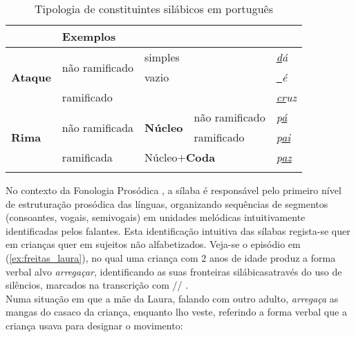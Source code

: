 \documentclass[output=paper]{LSP/langsci}
\begin{document}
\begin{table}
\begin{tabular}{lllll}
\lsptoprule
\multicolumn{4}{l}{Constituintes Silábicos}                                                          & Exemplos \\
\midrule
\multirow{3}{*}{\textbf{Ataque}} & \multirow{2}{*}{não ramificado} & \multicolumn{2}{l}{simples}              & \textit{\underline{d}á}       \\
                        &                                 & \multicolumn{2}{l}{vazio}                & \textit{\underline{~}é}       \\
                        & \multicolumn{3}{l}{ramificado}                                             & \textit{\underline{cr}uz}     \\
\multirow{3}{*}{\textbf{Rima}}   & \multirow{2}{*}{não ramificada} & \multirow{2}{*}{\textbf{Núcleo}} & não ramificado & \textit{p\underline{á}}       \\
                        &                                 &                         & ramificado     & \textit{p\underline{ai}}      \\
                        & ramificada                      & \multicolumn{2}{l}{Núcleo$+$\textbf{Coda}}          & \textit{p\underline{az}}     \\
\lspbottomrule
  \end{tabular}
  \caption{Tipologia de constituintes silábicos em português}
  \label{tab:freitas_tipologia}
\end{table}

No contexto da Fonologia Prosódica \citep{nesporvogel1986}, a sílaba é responsável pelo primeiro nível de estruturação prosódica das línguas, organizando sequências de segmentos (consoantes, vogais, semivogais) em unidades melódicas intuitivamente identificadas pelos falantes. Esta identificação intuitiva das sílabas regista-se quer em crianças quer em sujeitos não alfabetizados. Veja-se o episódio em (\ref{ex:freitas_laura}), no qual uma criança com 2 anos de idade produz a forma verbal alvo \textit{arregaçar}, identificando as suas fronteiras silábicas\largerpage através do uso de silêncios, marcados na transcrição com // \citep{freitas1997,freitas_etal2007}.\\

Numa situação em que a mãe da Laura, falando com outro adulto, \textit{arregaça} as mangas do casaco da criança, enquanto lho veste, referindo a forma verbal que a criança usava para designar o movimento:
\end{document}
